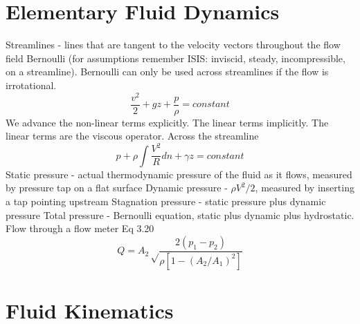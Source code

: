 \documentclass{article}
\begin{document}
%
%
\newpage
\section{Elementary Fluid Dynamics}

Streamlines - lines that are tangent to the velocity vectors throughout the flow field
\newline
\newline
Bernoulli (for assumptions remember ISIS: inviscid, steady, incompressible, on a streamline). Bernoulli can only be used across streamlines if the flow is irrotational.
\begin{equation}
  \frac{v^2}{2}+gz+\frac{p}{\rho}=constant
\end{equation}
We advance the non-linear terms explicitly. The linear terms implicitly. The linear terms are the viscous operator. 
\newline
\newline
Across the streamline
\begin{equation}
    p + \rho\int\frac{V^2}{R}dn + \gamma z = constant
\end{equation}
\newline
\newline
Static pressure - actual thermodynamic pressure of the fluid as it flows, measured by pressure tap on a flat surface
\newline
\newline
Dynamic pressure - $\rho V^2/2$, measured by inserting a tap pointing upstream
\newline
\newline
Stagnation pressure - static pressure plus dynamic pressure
\newline
\newline
Total pressure - Bernoulli equation, static plus dynamic plus hydrostatic.
\newline
\newline
Flow through a flow meter Eq 3.20
\begin{equation}
    Q = A_2\sqrt\frac{2(p_1-p_2)}{\rho[1-(A_2/A_1)^2]}
\end{equation}


%
%
\newpage
\section{Fluid Kinematics}
\end{document}
